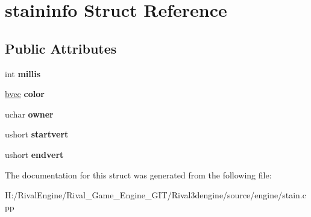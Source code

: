 \hypertarget{structstaininfo}{}\section{staininfo Struct Reference}
\label{structstaininfo}
\subsection*{Public Attributes}
\begin{DoxyCompactItemize}
\item 
\mbox{\label{structstaininfo_a38c68fa92dac96abf77de68ea4ad5b7b}} 
int {\bfseries millis}
\item 
\mbox{\label{structstaininfo_a8f86c46bc16ef6f378c97ce5e04adaf6}} 
\hyperlink{structbvec}{bvec} {\bfseries color}
\item 
\mbox{\label{structstaininfo_ab62c502247d40abae2f4e3e225ff35d6}} 
uchar {\bfseries owner}
\item 
\mbox{\label{structstaininfo_a19d91d4c2fcd7c296c2f422c50e4d8d2}} 
ushort {\bfseries startvert}
\item 
\mbox{\label{structstaininfo_a861fff0dc686eefde482da343a0cabc7}} 
ushort {\bfseries endvert}
\end{DoxyCompactItemize}


The documentation for this struct was generated from the following file\+:\begin{DoxyCompactItemize}
\item 
H\+:/\+Rival\+Engine/\+Rival\+\_\+\+Game\+\_\+\+Engine\+\_\+\+G\+I\+T/\+Rival3dengine/source/engine/stain.\+cpp\end{DoxyCompactItemize}
